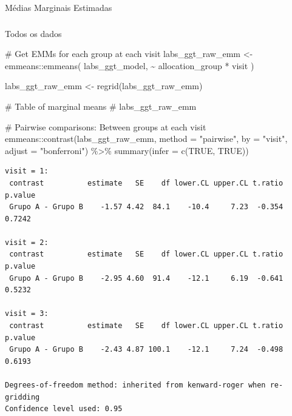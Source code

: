 \documentclass[
  12pt,
]{article}
\makeatletter
\let\oldparagraph\paragraph
\renewcommand{\paragraph}{
    \@ifstar
      \xxxParagraphStar
      \xxxParagraphNoStar
  }
\newcommand{\xxxParagraphStar}[1]{\oldparagraph*{#1}\mbox{}}
\newcommand{\xxxParagraphNoStar}[1]{\oldparagraph{#1}\mbox{}}
\let\oldsubparagraph\subparagraph
\renewcommand{\subparagraph}{
    \@ifstar
      \xxxSubParagraphStar
      \xxxSubParagraphNoStar
  }
\newcommand{\xxxSubParagraphStar}[1]{\oldsubparagraph*{#1}\mbox{}}
\newcommand{\xxxSubParagraphNoStar}[1]{\oldsubparagraph{#1}\mbox{}}
\newenvironment{Shaded}{\begin{snugshade}}{\end{snugshade}}
\newcommand{\AttributeTok}[1]{\textcolor[rgb]{0.40,0.45,0.13}{#1}}
\newcommand{\CommentTok}[1]{\textcolor[rgb]{0.37,0.37,0.37}{#1}}
\newcommand{\ConstantTok}[1]{\textcolor[rgb]{0.56,0.35,0.01}{#1}}
\newcommand{\FunctionTok}[1]{\textcolor[rgb]{0.28,0.35,0.67}{#1}}
\newcommand{\NormalTok}[1]{\textcolor[rgb]{0.00,0.23,0.31}{#1}}
\newcommand{\OtherTok}[1]{\textcolor[rgb]{0.00,0.23,0.31}{#1}}
\newcommand{\SpecialCharTok}[1]{\textcolor[rgb]{0.37,0.37,0.37}{#1}}
\newcommand{\StringTok}[1]{\textcolor[rgb]{0.13,0.47,0.30}{#1}}
\makeatother
\begin{document}
\paragraph{Médias Marginais
Estimadas}\label{muxe9dias-marginais-estimadas-2}

\subparagraph{Todos os dados}\label{todos-os-dados-2}

\begin{Shaded}
\begin{Highlighting}[]
\CommentTok{\# Get EMMs for each group at each visit}
\NormalTok{labs\_ggt\_raw\_emm }\OtherTok{\textless{}{-}}\NormalTok{ emmeans}\SpecialCharTok{::}\FunctionTok{emmeans}\NormalTok{(}
\NormalTok{    labs\_ggt\_model, }
    \SpecialCharTok{\textasciitilde{}}\NormalTok{ allocation\_group }\SpecialCharTok{*}\NormalTok{ visit}
\NormalTok{)}

\NormalTok{labs\_ggt\_raw\_emm }\OtherTok{\textless{}{-}} \FunctionTok{regrid}\NormalTok{(labs\_ggt\_raw\_emm)}

\CommentTok{\# Table of marginal means}
\CommentTok{\# labs\_ggt\_raw\_emm}

\CommentTok{\# Pairwise comparisons: Between groups at each visit}
\NormalTok{emmeans}\SpecialCharTok{::}\FunctionTok{contrast}\NormalTok{(labs\_ggt\_raw\_emm,}
\AttributeTok{method =} \StringTok{"pairwise"}\NormalTok{, }\AttributeTok{by =} \StringTok{"visit"}\NormalTok{,}
\AttributeTok{adjust =} \StringTok{"bonferroni"}\NormalTok{) }\SpecialCharTok{\%\textgreater{}\%} \FunctionTok{summary}\NormalTok{(}\AttributeTok{infer =} \FunctionTok{c}\NormalTok{(}\ConstantTok{TRUE}\NormalTok{, }\ConstantTok{TRUE}\NormalTok{))}
\end{Highlighting}
\end{Shaded}

\begin{verbatim}
visit = 1:
 contrast          estimate   SE    df lower.CL upper.CL t.ratio p.value
 Grupo A - Grupo B    -1.57 4.42  84.1    -10.4     7.23  -0.354  0.7242

visit = 2:
 contrast          estimate   SE    df lower.CL upper.CL t.ratio p.value
 Grupo A - Grupo B    -2.95 4.60  91.4    -12.1     6.19  -0.641  0.5232

visit = 3:
 contrast          estimate   SE    df lower.CL upper.CL t.ratio p.value
 Grupo A - Grupo B    -2.43 4.87 100.1    -12.1     7.24  -0.498  0.6193

Degrees-of-freedom method: inherited from kenward-roger when re-gridding 
Confidence level used: 0.95 
\end{verbatim}
\end{document}

